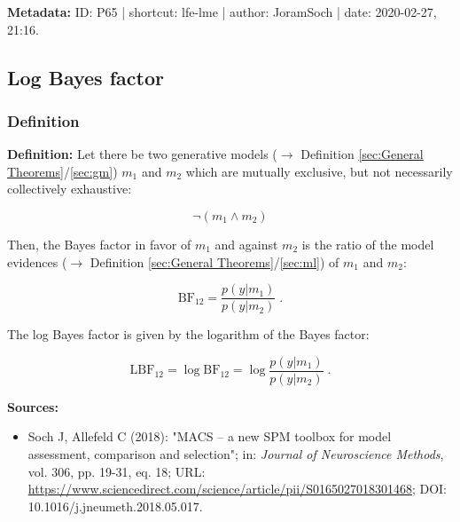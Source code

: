 \documentclass[a4paper,12pt,twoside]{book}
\begin{document}
\vspace{1em}
\textbf{Metadata:} ID: P65 | shortcut: lfe-lme | author: JoramSoch | date: 2020-02-27, 21:16.
\vspace{1em}



\subsection{Log Bayes factor}

\subsubsection[\textit{Definition}]{Definition} \label{sec:lbf}
\setcounter{equation}{0}

\textbf{Definition:} Let there be two generative models ($\rightarrow$ Definition \ref{sec:General Theorems}/\ref{sec:gm}) $m_1$ and $m_2$ which are mutually exclusive, but not necessarily collectively exhaustive:

\begin{equation} \label{eq:lbf-m12}
\neg (m_1 \land m_2)
\end{equation}

Then, the Bayes factor in favor of $m_1$ and against $m_2$ is the ratio of the model evidences ($\rightarrow$ Definition \ref{sec:General Theorems}/\ref{sec:ml}) of $m_1$ and $m_2$:

\begin{equation} \label{eq:lbf-bf}
\mathrm{BF}_{12} = \frac{p(y|m_1)}{p(y|m_2)} \; .
\end{equation}

The log Bayes factor is given by the logarithm of the Bayes factor:

\begin{equation} \label{eq:lbf-lbf}
\mathrm{LBF}_{12} = \log \mathrm{BF}_{12} = \log \frac{p(y|m_1)}{p(y|m_2)} \; .
\end{equation}


\vspace{1em}
\textbf{Sources:}
\begin{itemize}
\item Soch J, Allefeld C (2018): "MACS – a new SPM toolbox for model assessment, comparison and selection"; in: \textit{Journal of Neuroscience Methods}, vol. 306, pp. 19-31, eq. 18; URL: \url{https://www.sciencedirect.com/science/article/pii/S0165027018301468}; DOI: 10.1016/j.jneumeth.2018.05.017.
\end{itemize}
\end{document}
